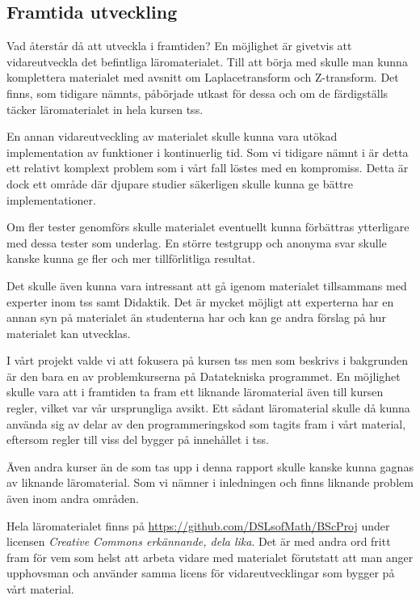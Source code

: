 \documentclass[12pt,a4paper,twoside,openright]{article}
\begin{document}
\subsection{Framtida utveckling}
Vad återstår då att utveckla i framtiden? En möjlighet är givetvis att
vidareutveckla det befintliga läromaterialet. Till att börja med
skulle man kunna komplettera materialet med avsnitt om
Laplacetransform och Z-transform. Det finns, som tidigare nämnts,
påbörjade utkast för dessa och om de färdigställs täcker
läromaterialet in hela kursen \gls{tss}.

En annan vidareutveckling av materialet skulle kunna vara utökad
implementation av funktioner i kontinuerlig tid. Som vi tidigare nämnt
i  är detta ett relativt komplext problem som i
vårt fall löstes med en kompromiss. Detta är dock ett område där
djupare studier säkerligen skulle kunna ge bättre implementationer.

Om fler tester genomförs skulle materialet eventuellt kunna förbättras
ytterligare med dessa tester som underlag. En större testgrupp och
anonyma svar skulle kanske kunna ge fler och mer tillförlitliga
resultat.

Det skulle även kunna vara intressant att gå igenom materialet
tillsammans med experter inom \gls{tss} samt Didaktik. Det är
mycket möjligt att experterna har en annan syn på materialet än
studenterna har och kan ge andra förslag på hur materialet kan
utvecklas.

I vårt projekt valde vi att fokusera på kursen \gls{tss} men som
beskrivs i bakgrunden är den bara en av problemkurserna på
Datatekniska programmet. En möjlighet skulle vara att i framtiden ta
fram ett liknande läromaterial även till kursen
\gls{regler}, vilket var vår ursprungliga avsikt. Ett sådant läromaterial skulle då kunna använda
sig av delar av den programmeringskod som tagits fram i vårt material,
eftersom \gls{regler} till viss del bygger på innehållet i
\gls{tss}.

Även andra kurser än de som tas upp i denna rapport skulle kanske
kunna gagnas av liknande läromaterial. Som vi nämner i inledningen och
 finns liknande problem även inom andra
områden.

Hela läromaterialet finns på
\url{https://github.com/DSLsofMath/BScProj} under\\licensen
\textit{Creative Commons erkännande, dela lika}.
Det är med andra ord fritt fram för
vem som helst att arbeta vidare med materialet förutstatt att man anger
upphovsman och använder samma licens för vidareutvecklingar som bygger på
vårt material.
\end{document}
